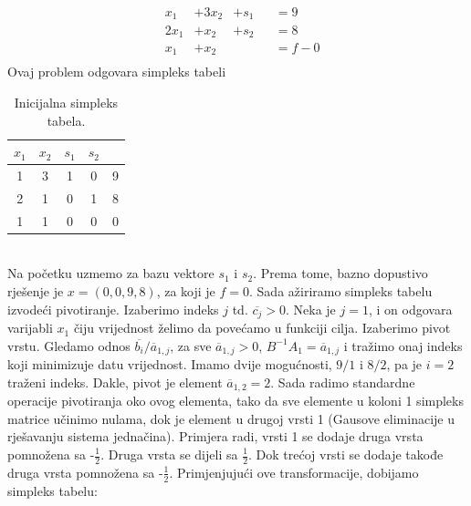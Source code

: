 \documentclass[a4paper, utf8, 11pt, colorlinks]{book}
\begin{document}
\begin{align*}
    & x_1    & + 3x_2  &+ s_1& &= 9 \\
    & 2 x_1 &   + x_2  & + s_2& &= 8 \\
    & x_1   &   + x_2  &\  & &= f - 0 \\
\end{align*}
 Ovaj problem odgovara simpleks tabeli \\
 \begin{table}[!ht]
     \centering
     \begin{tabular}{c c c c | c}
     	 $x_1$ & $x_2$ &  $s_1$ & $s_2$ & \\ \hline
         1 &  3  & 1 & 0 & 9 \\
         2 &  1  & 0 & 1 & 8 \\ \hline
         1 &  1  & 0  & 0 & 0 \\ \hline
     \end{tabular}
     \caption{Inicijalna simpleks tabela.}
     \label{tab:simpleks_tabela1}
 \end{table} \\
 Na početku uzmemo za bazu vektore $s_1$ i $s_2$. Prema tome, bazno dopustivo rješenje je $x = (0, 0, 9, 8)$, za koji je $f =0$. Sada ažiriramo simpleks tabelu izvodeći pivotiranje. Izaberimo indeks $j$ td. $\overline{c_j}>0$. Neka je $j=1$, i on odgovara varijabli $x_1$ čiju vrijednost želimo da povećamo u funkciji cilja. Izaberimo pivot vrstu. Gledamo odnos $\overline{b_i}/\overline{a}_{1,j}$, za sve $\overline{a}_{1,j} > 0$,  $B^{-1} A_1 = \overline{a}_{1,j}$
 i tražimo onaj indeks koji minimizuje datu vrijednost. Imamo dvije mogućnosti, $9/1$ i $8/2$, pa je $i = 2$ traženi indeks. Dakle, pivot je element $\overline{a}_{1,2}=2$. Sada radimo standardne operacije pivotiranja oko ovog elementa,  tako da sve elemente u koloni 1 simpleks matrice učinimo nulama, dok je element u drugoj vrsti 1 (Gausove eliminacije u rješavanju sistema jednačina). Primjera radi, vrsti 1 se dodaje druga vrsta pomnožena sa -$\frac{1}{2}$. Druga vrsta se dijeli sa $\frac{1}{2}$. Dok trećoj vrsti se dodaje takođe druga vrsta pomnožena sa -$\frac{1}{2}$. 
 Primjenjujući ove transformacije, dobijamo simpleks tabelu:
 
\end{document}
